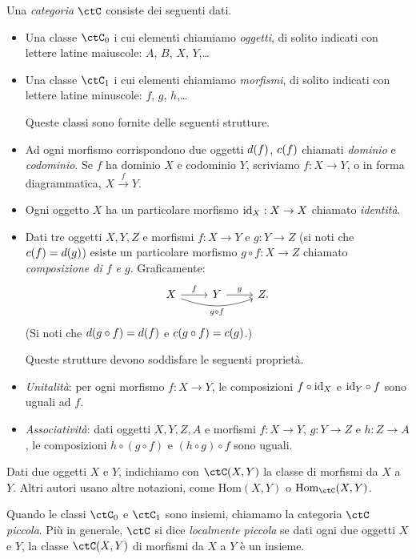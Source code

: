 \begin{definition}
 Una \emph{categoria} $\ctC$ consiste dei seguenti dati.
 \begin{itemize}
  \item Una classe $\ctC_0$ i cui elementi chiamiamo \emph{oggetti}, di solito indicati con lettere latine maiuscole: $A$, $B$, $X$, $Y$,\dots
  \item Una classe $\ctC_1$ i cui elementi chiamiamo \emph{morfismi}, di solito indicati con lettere latine minuscole: $f$, $g$, $h$,\dots
  
  Queste classi sono fornite delle seguenti strutture. 
  
  \item Ad ogni morfismo corrispondono due oggetti $d(f)$, $c(f)$ chiamati \emph{dominio} e \emph{codominio}. Se $f$ ha dominio $X$ e codominio $Y$, scriviamo $f:X\to Y$, o in forma diagrammatica, $X \xrightarrow{f} Y$.
  \item Ogni oggetto $X$ ha un particolare morfismo $\mathrm{id}_X:X\to X$ chiamato \emph{identità}.
  \item Dati tre oggetti $X,Y,Z$ e morfismi $f:X\to Y$ e $g:Y\to Z$ (si noti che $c(f)=d(g)$) esiste un particolare morfismo $g\circ f:X\to Z$ chiamato \emph{composizione di $f$ e $g$}. Graficamente:
  $$
  \begin{tikzcd}
   X \ar{r}{f} \ar[bend right=20]{rr}[swap]{g\circ f} & Y \ar{r}{g} & Z .
  \end{tikzcd}
  $$
  (Si noti che $d(g\circ f)=d(f)$ e $c(g\circ f)=c(g)$.)
  
  Queste strutture devono soddisfare le seguenti proprietà.
  
  \item \emph{Unitalità}: per ogni morfismo $f:X\to Y$, le composizioni $f\circ\mathrm{id}_X$ e $\mathrm{id}_Y\circ f$ sono uguali ad $f$.
  \item \emph{Associatività}: dati oggetti $X,Y,Z,A$ e morfismi $f:X\to Y$, $g:Y\to Z$ e $h:Z\to A$, le composizioni $h\circ (g\circ f)$ e $(h\circ g)\circ f$ sono uguali.
 \end{itemize}
\end{definition}

Dati due oggetti $X$ e $Y$, indichiamo con $\Hom{\ctC}(X,Y)$ la classe di morfismi da $X$ a $Y$. Altri autori usano altre notazioni, come $\mathrm{Hom}(X,Y)$ o $\mathrm{Hom}_\ctC(X,Y)$.


Quando le classi $\ctC_0$ e $\ctC_1$ sono insiemi, chiamamo la categoria $\ctC$ \emph{piccola}. Più in generale, $\ctC$ si dice \emph{localmente piccola} se dati ogni due oggetti $X$ e $Y$, la classe $\Hom{\ctC}(X,Y)$ di morfismi da $X$ a $Y$ è un insieme. 

